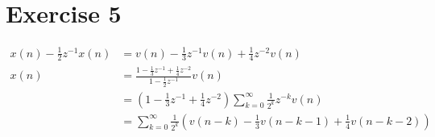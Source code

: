 
\section*{Exercise 5}

\begin{align}
	x(n)-\frac{1}{2}z^{-1}x(n)&=v(n)-\frac{1}{3}z^{-1}v(n)+\frac{1}{4}z^{-2}v(n)\\
	x(n)&=\frac{1-\frac{1}{3}z^{-1}+\frac{1}{4}z^{-2}}{1-\frac{1}{2}z^{-1}}v(n)\\
	&=\left(1-\frac{1}{3}z^{-1}+\frac{1}{4}z^{-2}\right)\sum_{k=0}^\infty \frac{1}{2^k}z^{-k}v(n)\\
	&=\sum_{k=0}^\infty \frac{1}{2^k}\left(v(n-k)-\frac{1}{3}v(n-k-1)+\frac{1}{4}v(n-k-2)\right)  
\end{align}


